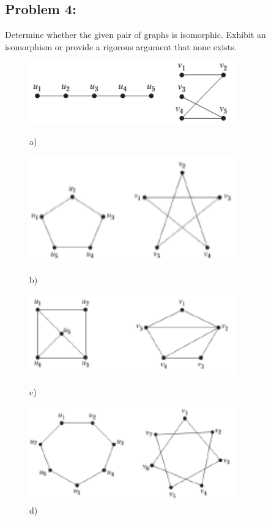 \documentclass[a4paper]{article}
\begin{document}
	\subsection*{Problem 4:}
	Determine whether the given pair of graphs is isomorphic. Exhibit an isomorphism or provide a rigorous argument that none exists.
	\begin{figure}[ht]
		\begin{minipage}{0.5\textwidth}
			\centering
			\includegraphics[width=0.8\textwidth]{gprob4_1.png}
			\caption*{a)}
		\end{minipage}
		\begin{minipage}{0.5\textwidth}
			\centering
			\includegraphics[width=0.8\textwidth]{gprob4_2.png}
			\caption*{b)}
		\end{minipage}
		\begin{minipage}{0.5\textwidth}
			\centering
			\includegraphics[width=0.8\textwidth]{gprob4_3.png}
			\caption*{c)}
		\end{minipage}
		\begin{minipage}{0.5\textwidth}
			\centering
			\includegraphics[width=0.8\textwidth]{gprob4_4.png}
			\caption*{d)}
		\end{minipage}
	\end{figure}
\end{document}
